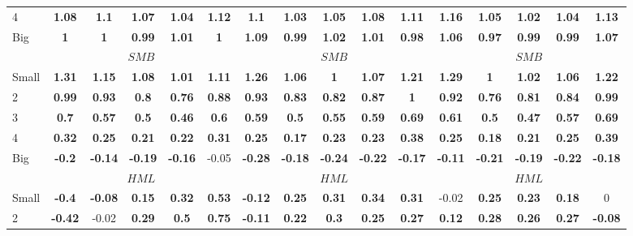 \begin{table}[H]
\begin{tabular}{lccccc|ccccc|ccccc}
4 & \textbf{1.08} & \textbf{1.1} & \textbf{1.07} & \textbf{1.04} & \textbf{1.12} & \textbf{1.1} & \textbf{1.03} & \textbf{1.05} & \textbf{1.08} & \textbf{1.11} & \textbf{1.16} & \textbf{1.05} & \textbf{1.02} & \textbf{1.04} & \textbf{1.13} \\
Big & \textbf{1} & \textbf{1} & \textbf{0.99} & \textbf{1.01} & \textbf{1} & \textbf{1.09} & \textbf{0.99} & \textbf{1.02} & \textbf{1.01} & \textbf{0.98} & \textbf{1.06} & \textbf{0.97} & \textbf{0.99} & \textbf{0.99} & \textbf{1.07} \\
 & \multicolumn{5}{c|}{$SMB$} & \multicolumn{5}{c|}{$SMB$} & \multicolumn{5}{c}{$SMB$} \\
Small & \textbf{1.31} & \textbf{1.15} & \textbf{1.08} & \textbf{1.01} & \textbf{1.11} & \textbf{1.26} & \textbf{1.06} & \textbf{1} & \textbf{1.07} & \textbf{1.21} & \textbf{1.29} & \textbf{1} & \textbf{1.02} & \textbf{1.06} & \textbf{1.22} \\
2 & \textbf{0.99} & \textbf{0.93} & \textbf{0.8} & \textbf{0.76} & \textbf{0.88} & \textbf{0.93} & \textbf{0.83} & \textbf{0.82} & \textbf{0.87} & \textbf{1} & \textbf{0.92} & \textbf{0.76} & \textbf{0.81} & \textbf{0.84} & \textbf{0.99} \\
3 & \textbf{0.7} & \textbf{0.57} & \textbf{0.5} & \textbf{0.46} & \textbf{0.6} & \textbf{0.59} & \textbf{0.5} & \textbf{0.55} & \textbf{0.59} & \textbf{0.69} & \textbf{0.61} & \textbf{0.5} & \textbf{0.47} & \textbf{0.57} & \textbf{0.69} \\
4 & \textbf{0.32} & \textbf{0.25} & \textbf{0.21} & \textbf{0.22} & \textbf{0.31} & \textbf{0.25} & \textbf{0.17} & \textbf{0.23} & \textbf{0.23} & \textbf{0.38} & \textbf{0.25} & \textbf{0.18} & \textbf{0.21} & \textbf{0.25} & \textbf{0.39} \\
Big & \textbf{-0.2} & \textbf{-0.14} & \textbf{-0.19} & \textbf{-0.16} & -0.05 & \textbf{-0.28} & \textbf{-0.18} & \textbf{-0.24} & \textbf{-0.22} & \textbf{-0.17} & \textbf{-0.11} & \textbf{-0.21} & \textbf{-0.19} & \textbf{-0.22} & \textbf{-0.18} \\
 & \multicolumn{5}{c|}{$HML$} & \multicolumn{5}{c|}{$HML$} & \multicolumn{5}{c}{$HML$} \\
Small & \textbf{-0.4} & \textbf{-0.08} & \textbf{0.15} & \textbf{0.32} & \textbf{0.53} & \textbf{-0.12} & \textbf{0.25} & \textbf{0.31} & \textbf{0.34} & \textbf{0.31} & -0.02 & \textbf{0.25} & \textbf{0.23} & \textbf{0.18} & 0 \\
2 & \textbf{-0.42} & -0.02 & \textbf{0.29} & \textbf{0.5} & \textbf{0.75} & \textbf{-0.11} & \textbf{0.22} & \textbf{0.3} & \textbf{0.25} & \textbf{0.27} & \textbf{0.12} & \textbf{0.28} & \textbf{0.26} & \textbf{0.27} & \textbf{-0.08} \\

\end{tabular}
\end{table}
